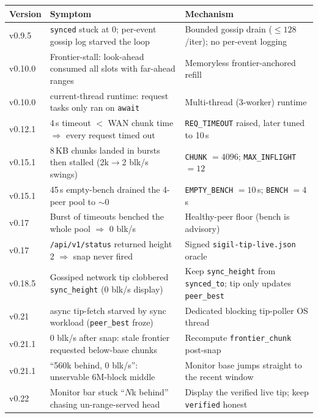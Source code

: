 \documentclass[11pt,a4paper]{article}
\newcommand{\code}[1]{\lstinline[basicstyle=\ttfamily\normalsize\color{codekw}]{#1}}
\begin{document}
\begin{center}\small
\begin{longtable}{@{}p{2.1cm}p{6.0cm}p{6.3cm}@{}}
\toprule
\textbf{Version} & \textbf{Symptom} & \textbf{Mechanism} \\
\midrule
\endhead
v0.9.5  & \texttt{synced} stuck at 0; per-event gossip log starved the loop &
  Bounded gossip drain ($\le 128$/iter); no per-event logging \\
v0.10.0 & Frontier-stall: look-ahead consumed all slots with far-ahead ranges &
  Memoryless frontier-anchored refill \\
v0.10.0 & current-thread runtime: request tasks only ran on \code{await} &
  Multi-thread (3-worker) runtime \\
v0.12.1 & 4\,s timeout $<$ WAN chunk time $\Rightarrow$ every request timed out &
  \texttt{REQ\_TIMEOUT} raised, later tuned to 10\,s \\
v0.15.1 & 8\,KB chunks landed in bursts then stalled (2k$\to$2 blk/s swings) &
  \texttt{CHUNK} $= 4096$; \texttt{MAX\_INFLIGHT} $= 12$ \\
v0.15.1 & 45\,s empty-bench drained the 4-peer pool to $\sim$0 &
  \texttt{EMPTY\_BENCH} $= 10$\,s; \texttt{BENCH} $= 4$\,s \\
v0.17   & Burst of timeouts benched the whole pool $\Rightarrow$ 0 blk/s &
  Healthy-peer floor (bench is advisory) \\
v0.17   & \verb!/api/v1/status! returned height 2 $\Rightarrow$ snap never fired &
  Signed \texttt{sigil-tip-live.json} oracle \\
v0.18.5 & Gossiped network tip clobbered \texttt{sync\_height} (0 blk/s display) &
  Keep \texttt{sync\_height} from \code{synced_to}; tip only updates \texttt{peer\_best} \\
v0.21   & async tip-fetch starved by sync workload (\texttt{peer\_best} froze) &
  Dedicated blocking tip-poller OS thread \\
v0.21.1 & 0 blk/s after snap: stale frontier requested below-base chunks &
  Recompute \texttt{frontier\_chunk} post-snap \\
v0.21.1 & ``560k behind, 0 blk/s'': unservable 6M-block middle &
  Monitor base jumps straight to the recent window \\
v0.22   & Monitor bar stuck ``$N$k behind'' chasing un-range-served head &
  Display the verified live tip; keep \texttt{verified} honest \\
\bottomrule
\end{longtable}
\end{center}
\end{document}
